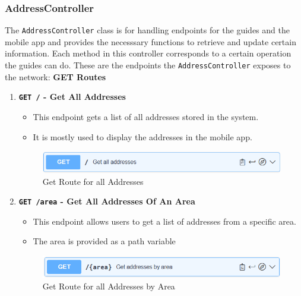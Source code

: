     \subsubsection{AddressController}
    The \texttt{AddressController} class is for handling endpoints for the guides and the mobile app and provides the necesssary functions to retrieve and update certain information. Each method in this controller corresponds to a certain operation the guides can do. These are the endpoints the \texttt{AddressController} exposes to the network: \newline \newline
    \textbf{GET Routes} 
    \begin{enumerate}
        \item \textbf{\texttt{GET /} - Get All Addresses}
        \begin{itemize}
            \item This endpoint gets a list of all addresses stored in the system. 
            \item It is mostly used to display the addresses in the mobile app.
        \end{itemize} 
        \begin{figure} [H]
            \centering
            \includegraphics [width=1\textwidth] {images/andreas/praxis/getAllAddresses.png}
            \caption{Get Route for all Addresses}
        \end{figure}

        \item \textbf{\texttt{GET /{area}} - Get All Addresses Of An Area}
        \begin{itemize}
            \item This endpoint allows users to get a list of addresses from a specific area.
            \item The area is provided as a path variable
        \end{itemize}
        \begin{figure} [H]
            \centering
            \includegraphics [width=1\textwidth] {images/andreas/praxis/getAddressesByArea.png}
            \caption{Get Route for all Addresses by Area}
        \end{figure}


\end{enumerate}
